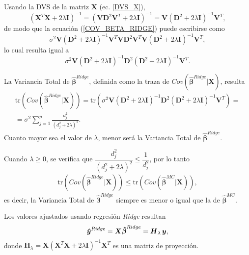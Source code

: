 \documentclass[a4paper,12pt]{report}
\begin{document}
Usando la DVS de la matriz $\boldsymbol{X}$ (ec. \ref{DVS_X}), 
\begin{equation}
(\boldsymbol{X}^T\boldsymbol{X}+2\lambda \boldsymbol{I})^{-1}=(\boldsymbol{V}\boldsymbol{D}^2\boldsymbol{V}^T+2\lambda\boldsymbol{I})^{-1}=\boldsymbol{V}(\boldsymbol{D}^2+2\lambda\boldsymbol{I})^{-1}\boldsymbol{V}^T,
\end{equation}
de modo que la ecuación (\ref{COV_BETA_RIDGE}) puede escribirse como
\begin{equation}
\sigma^2\boldsymbol{V}(\boldsymbol{D}^2+2\lambda\boldsymbol{I})^{-1}\boldsymbol{V}^T\boldsymbol{V}\boldsymbol{D}^2\boldsymbol{V}^T\boldsymbol{V}(\boldsymbol{D}^2+2\lambda\boldsymbol{I})^{-1}\boldsymbol{V}^T,
\end{equation}
lo cual resulta igual a
\begin{equation}
\sigma^2\boldsymbol{V}(\boldsymbol{D}^2+2\lambda\boldsymbol{I})^{-1}\boldsymbol{D}^2(\boldsymbol{D}^2+2\lambda\boldsymbol{I})^{-1}\boldsymbol{V}^T.
\end{equation}

La Variancia Total de $\boldsymbol{\hat{\beta}}^{Ridge}$, definida como la traza de $Cov\left(\boldsymbol{\hat{\beta}}^{Ridge}|\boldsymbol{X}\right)$, resulta
\begin{gather}
\nonumber
\text{tr}\left(Cov\left(\boldsymbol{\hat{\beta}}^{Ridge}|\boldsymbol{X}\right)\right)=\text{tr}\left(\sigma^2\boldsymbol{V}(\boldsymbol{D}^2+2\lambda\boldsymbol{I})^{-1}\boldsymbol{D}^2(\boldsymbol{D}^2+2\lambda\boldsymbol{I})^{-1}\boldsymbol{V}^T\right)=\\
=\sigma^2\sum_{j=1}^p\frac{d_j^2}{(d_j^2+2\lambda)^2}.
\end{gather}
Cuanto mayor sea el valor de $\lambda$, menor será la Variancia Total de $\boldsymbol{\hat{\beta}}^{Ridge}$.

Cuando $\lambda \geq 0$, se verifica que $\dfrac{d_j^2}{(d_j^2+2\lambda)^2} \leq \dfrac{1}{d_j^2}$, por lo tanto
\begin{gather}
\text{tr} \left( Cov \left(\boldsymbol{\hat{\beta}}^{Ridge}|\boldsymbol{X} \right)\right)\leq \text{tr}\left(Cov\left(\boldsymbol{\hat{\beta}}^{MC}|\boldsymbol{X}\right) \right) ,
\end{gather}
es decir, la Variancia Total de $\boldsymbol{\hat{\beta}}^{Ridge}$ siempre es menor o igual que la de $\boldsymbol{\hat{\beta}}^{MC}$.

Los valores ajustados usando regresión \textit{Ridge} resultan
\begin{equation}
\boldsymbol{\hat{y}}^{Ridge}=\boldsymbol{X}\boldsymbol{\hat{\beta}}^{Ridge}=\boldsymbol{H}_\lambda \hspace{0.05cm} \boldsymbol{y},
\end{equation}
donde $\boldsymbol{H}_\lambda=\boldsymbol{X}(\boldsymbol{X}^T\boldsymbol{X}+2\lambda \boldsymbol{I})^{-1}\boldsymbol{X}^T$ es una matriz de proyección.
\end{document}

